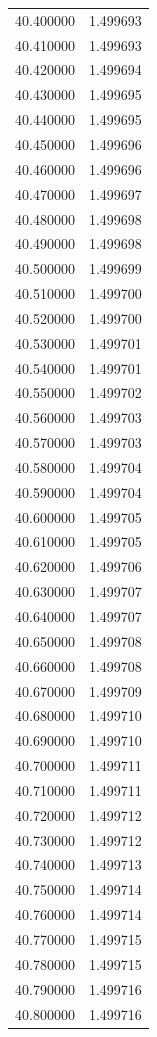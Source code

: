 \begin{tabular}{rr}
40.400000 & 1.499693 \\
40.410000 & 1.499693 \\
40.420000 & 1.499694 \\
40.430000 & 1.499695 \\
40.440000 & 1.499695 \\
40.450000 & 1.499696 \\
40.460000 & 1.499696 \\
40.470000 & 1.499697 \\
40.480000 & 1.499698 \\
40.490000 & 1.499698 \\
40.500000 & 1.499699 \\
40.510000 & 1.499700 \\
40.520000 & 1.499700 \\
40.530000 & 1.499701 \\
40.540000 & 1.499701 \\
40.550000 & 1.499702 \\
40.560000 & 1.499703 \\
40.570000 & 1.499703 \\
40.580000 & 1.499704 \\
40.590000 & 1.499704 \\
40.600000 & 1.499705 \\
40.610000 & 1.499705 \\
40.620000 & 1.499706 \\
40.630000 & 1.499707 \\
40.640000 & 1.499707 \\
40.650000 & 1.499708 \\
40.660000 & 1.499708 \\
40.670000 & 1.499709 \\
40.680000 & 1.499710 \\
40.690000 & 1.499710 \\
40.700000 & 1.499711 \\
40.710000 & 1.499711 \\
40.720000 & 1.499712 \\
40.730000 & 1.499712 \\
40.740000 & 1.499713 \\
40.750000 & 1.499714 \\
40.760000 & 1.499714 \\
40.770000 & 1.499715 \\
40.780000 & 1.499715 \\
40.790000 & 1.499716 \\
40.800000 & 1.499716 \\

\end{tabular}
